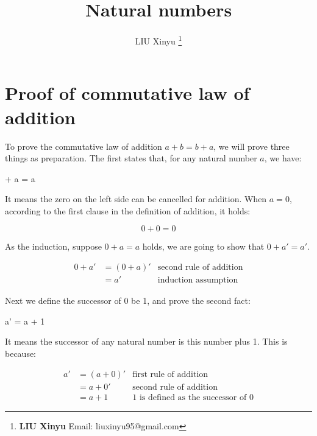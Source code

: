 \documentclass[UTF8]{article}
\begin{document}
\title{Natural numbers}

\author{LIU Xinyu
\thanks{{\bfseries LIU Xinyu} \newline
  Email: liuxinyu95@gmail.com \newline}
  }

\maketitle
\fi


\chapter*{Proof of commutative law of addition}

To prove the commutative law of addition $a + b = b + a$, we will prove three things as preparation. The first states that, for any natural number $a$, we have:

 + a = a
\label{eq:left-zero}
\ee

It means the zero on the left side can be cancelled for addition. When $a = 0$, according to the first clause in the definition of addition, it holds:

\[
0 + 0 = 0
\]

As the induction, suppose $0 + a = a$ holds, we are going to show that $0 + a' = a'$.

\[
\begin{array}{rlr}
0 + a' & = (0 + a)' & \text{second rule of addition} \\
       & = a' & \text{induction assumption}
\end{array}
\]

Next we define the successor of 0 be 1, and prove the second fact:

\be
a' = a + 1
\label{eq:one-succ}
\ee

It means the successor of any natural number is this number plus 1. This is because:

\[
\begin{array}{rlr}
a' & = (a + 0)' & \text{first rule of addition} \\
   & = a + 0' & \text{second rule of addition} \\
   & = a + 1 & \text{1 is defined as the successor of 0}
\end{array}
\]
\end{document}
